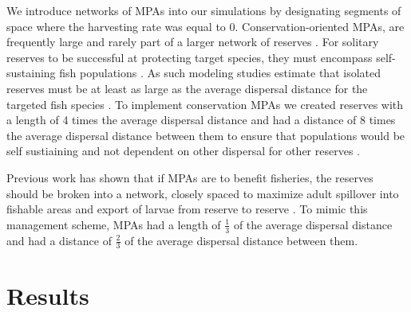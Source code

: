 \documentclass[12pt,english]{article}
\begin{document}
\begin{spacing}{1.9}
\begin{flushleft}
We introduce networks of MPAs into our simulations by designating segments of space where the harvesting rate was equal to $0$. Conservation-oriented MPAs, are frequently large and rarely part of a larger network of reserves \citep{HastingsBotsford2003}. For solitary reserves to be successful at protecting target species, they must encompass self-sustaining fish populations \citep{HastingsBotsford2006, Gainesetal2010a}. As such modeling studies estimate that isolated reserves must be at least as large as the average dispersal distance for the targeted fish species \citep{Lockwoodetal2002, HastingsBotsford2003, Botsfordetal2001, Gainesetal2010}. To implement conservation MPAs we created reserves with a length of 4 times the average dispersal distance and had a distance of 8 times the average dispersal distance between them to ensure that populations would be self sustiaining and not dependent on other dispersal for other reserves \citep{Lockwoodetal2002}. 

Previous work has shown that if MPAs are to benefit fisheries, the reserves should be broken into a network, closely spaced to maximize adult spillover into fishable areas and export of larvae from reserve to reserve \citep{ HastingsBotsford2003, Gaylordetal2005, Gainesetal2010a}. To mimic this management scheme, MPAs had a length of $\tfrac{1}{3}$ of the average dispersal distance and had a distance of $\tfrac{2}{3}$ of the average dispersal distance between them. 

\section{Results}


\end{flushleft}
\end{spacing}
\end{document}
